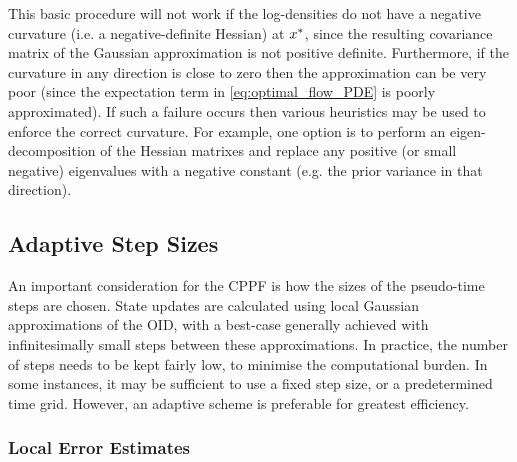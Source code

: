 \documentclass{article}
\begin{document}
This basic procedure will not work if the log-densities do not have a negative curvature (i.e. a negative-definite Hessian) at $x_{}^*$, since the resulting covariance matrix of the Gaussian approximation is not positive definite. Furthermore, if the curvature in any direction is close to zero then the approximation can be very poor (since the expectation term in \eqref{eq:optimal_flow_PDE} is poorly approximated). If such a failure occurs then various heuristics may be used to enforce the correct curvature. For example, one option is to perform an eigen-decomposition of the Hessian matrixes and replace any positive (or small negative) eigenvalues with a negative constant (e.g. the prior variance in that direction).
%







\subsection{Adaptive Step Sizes}

An important consideration for the CPPF is how the sizes of the pseudo-time steps are chosen. State updates are calculated using local Gaussian approximations of the OID, with a best-case generally achieved with infinitesimally small steps between these approximations. In practice, the number of steps needs to be kept fairly low, to minimise the computational burden. In some instances, it may be sufficient to use a fixed step size, or a predetermined time grid. However, an adaptive scheme is preferable for greatest efficiency.

\subsubsection{Local Error Estimates}
\end{document}

